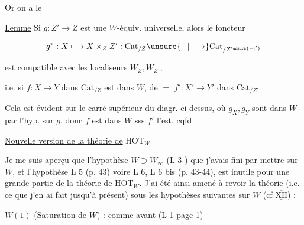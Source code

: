 Or on a le

\uline{Lemme} Si $g:Z'\longrightarrow Z$ est une $W$-équiv. universelle, alors le foncteur

\[
 g^*:X\longmapsto X\times_Z Z':\mathrm{Cat}_{/Z}\unsure{\mathord{-}|\longrightarrow}\mathrm{Cat}_{/Z^{\unsure{+|'}}}
\]

est compatible avec les localiseurs $W_Z,W_{Z'}$,


i.e. si $f:X\longrightarrow Y$ dans $\mathrm{Cat}_{/Z}$ est dans $W$, de $=$ $f':X'\longrightarrow Y'$ dans $\mathrm{Cat}_{/Z'}$.

Cela est évident sur le carré supérieur du diagr. ci-dessus, où $g_X,g_Y$ sont dans $W$ par l'hyp. sur $g$, donc $f$ est dans $W$ sss $f'$ l'est, cqfd



\uline{Nouvelle version de la théorie de} $\mathrm{HOT}_W$

Je me suis aperçu que l'hypothèse $W\supset W_\infty$ (L 3 ) que j'avais fini par mettre sur $W$,  et  l'hypothèse L 5 (p. 43) voire L 6, L 6 bis (p. 43-44), est inutile pour une grande partie de la théorie de $\mathrm{HOT}_W$. J'ai été ainsi amené à revoir la théorie (i.e. ce que j'en ai fait jusqu'à présent) sous les hypothèses suivantes sur $W$ (cf $\overline{\underline{\mathrm{XII}}}$) :

$W(1)$ (\uline{Saturation} de $W$) : comme avant (L 1 page 1)

